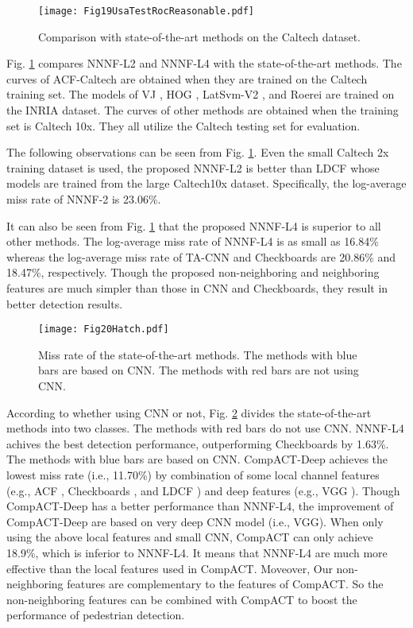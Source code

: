 \documentclass[10pt,twocolumn,letterpaper]{article}
\begin{document}
\begin{figure}[!t]
\centering
\texttt{[image: Fig19UsaTestRocReasonable.pdf]}
\caption{Comparison with state-of-the-art methods on the Caltech dataset.}
\label{FigCaltech}
\end{figure}

Fig. \ref{FigCaltech} compares NNNF-L2 and NNNF-L4 with the state-of-the-art 
methods. The 
curves of ACF-Caltech \cite{Dollar_PD_PAMI_2012} are obtained when they are trained on the Caltech 
training set. The models of VJ \cite{Viola_RoFace_IJCV_2004}, HOG \cite{Dalal_HOG_CVPR_2005}, LatSvm-V2 \cite{Felzenszwalb_DPM_CVPR_2008}, and Roerei \cite{Benenson_SquareChns_CVPR_2013} are trained on the INRIA dataset. The 
curves of other methods are obtained when the training set is Caltech 10x. 
They all utilize the Caltech testing set for evaluation. 

The following observations can be seen from Fig. \ref{FigCaltech}. Even the small Caltech 
2x training dataset is used, the proposed NNNF-L2 is better than LDCF \cite{Nam_LDCF_NIPS_2014} whose 
models are trained from the large Caltech10x dataset. Specifically, the 
log-average miss rate of NNNF-2 is 23.06{\%}. 

It can also be seen from Fig. \ref{FigCaltech} that the proposed NNNF-L4 is superior to 
all other methods. The log-average 
miss rate of NNNF-L4 is as small as 16.84{\%} whereas the log-average miss 
rate of TA-CNN \cite{Tian_Ta_CVPR_2015} and Checkboards \cite{Zhang_FCF_CVPR_2015} are 20.86{\%} and 18.47{\%}, 
respectively. Though the proposed non-neighboring and neighboring features 
are much simpler than those in CNN and Checkboards, they result in better detection results. 

\begin{figure}[!t]
\centering
\texttt{[image: Fig20Hatch.pdf]}
\caption{Miss rate of the state-of-the-art methods. The methods with blue bars are based on CNN. The methods with red bars are not using CNN.}
\label{FigHatch}
\end{figure}

According to whether using CNN or not, Fig. \ref{FigHatch} divides the state-of-the-art 
methods into two classes. The methods with red bars do not use CNN. NNNF-L4 achives the best detection performance, outperforming Checkboards \cite{Zhang_FCF_CVPR_2015} by 1.63\%. The methods with blue bars are based on CNN. CompACT-Deep \cite{Cai_DeepPed_ICCV_2015} achieves the lowest miss rate (i.e., 11.70\%) by combination of some local channel features (e.g., ACF \cite{Dollar_PD_PAMI_2012}, Checkboards \cite{Zhang_FCF_CVPR_2015}, and LDCF \cite{Nam_LDCF_NIPS_2014}) and deep features (e.g., VGG \cite{Simonyan_VGG_arxiv_2014}). Though CompACT-Deep \cite{Cai_DeepPed_ICCV_2015} has a better performance than NNNF-L4, the improvement of CompACT-Deep are based on very deep CNN model (i.e., VGG). When only using the above local features and small CNN, CompACT can only achieve 18.9\%, which is inferior to NNNF-L4. It means that NNNF-L4 are much more effective than the local features used in CompACT. Moveover, Our non-neighboring features are complementary to the features of CompACT. So the non-neighboring features can be combined with CompACT to boost the performance of pedestrian detection.
\end{document}
